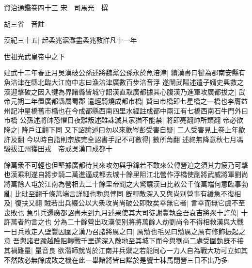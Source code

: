 資治通鑑卷四十三
宋　司馬光　撰

胡三省　音註

漢紀三十五|{
	起柔兆涺灘盡柔兆敦牂凡十一年}


世祖光武皇帝中之下

建武十二年春正月吳漢破公孫述將魏黨公孫永於魚涪津|{
	續漢書曰犍為郡南安縣有魚涪津在縣北臨大江南中志曰漁涪津廣數百步涪音浮}
遂闈武陽述遣子婿史興救之漢迎擊破之因入犍為界諸縣皆城守詔漢直取廣都據其心腹漢乃進軍攻廣都拔之|{
	武帝元朔二年置廣都縣屬蜀郡}
遣輕騎燒成都市橋|{
	賢曰市橋即七星橋之一橋也李膺益州記冲星橋舊市橋也在今成都縣西南四里水經註成都中兩江有七橋西南石牛門外曰市橋}
公孫述將帥恐懼日夜離叛述雖誅滅其家猶不能禁|{
	將即亮翻帥所類翻}
帝必欲降之|{
	降戶江翻下同}
又下詔諭述曰勿以來歙岑彭受害自疑|{
	二人受害見上卷上年歙許及翻}
今以時自詣則宗族完全詔書手記不可數得|{
	數所角翻}
述終無降意秋七月馮駿拔江州獲田戎　帝戒吳漢曰成都十

餘萬衆不可輕也但堅據廣都待其來攻勿與爭鋒若不敢來公轉營迫之須其力疲乃可擊也漢乘利遂自將步騎二萬進逼成都去城十餘里阻江北營作浮橋使副將武威將軍劉尚將萬餘人屯於江南為營相去二十餘里帝聞之大驚讓漢曰比敕公千條萬端何意臨事勃亂|{
	比毗至翻千條萬端言詳細也勃與悖同}
旣輕敵深入又與尚别營事有緩急不復相及|{
	復扶又翻}
賊若出兵綴公以大衆攻尚尚破公即敗矣幸無它者|{
	言幸而無它虞不至喪敗也}
急引兵還廣都詔書未到九月述果使其大司徒謝豐執金吾袁吉將衆十許萬|{
	十許萬者約言之也}
分為二十餘營出攻漢使别將將萬餘人劫劉尚令不得相救漢與大戰一日兵敗走入壁豐因圍之漢乃召諸將厲之曰|{
	厲勉也毛晃曰勉厲之厲有修飾振起之意}
吾與諸君踰越險阻轉戰千里遂深入敵地至其城下而今與劉尚二處受圍埶旣不接其禍難量|{
	量音良}
欲濳師就尚於江南并兵禦之若能同心一力人自為戰大功可立如其不然敗必無餘成敗之機在此一舉諸將皆曰諾於是饗士秣馬閉營三日不出乃多


